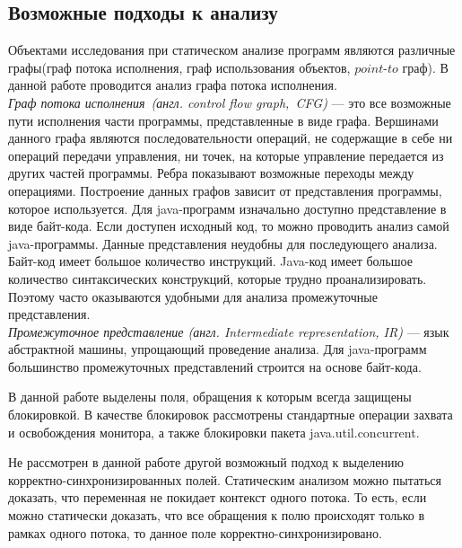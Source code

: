 \subsection{Возможные подходы к анализу}
Объектами исследования при статическом анализе программ являются различные графы(граф потока исполнения, граф использования объектов, $point$-$to$ граф\cite{Whaley:1999:CPE:320385.320400}). 
В данной работе проводится анализ графа потока исполнения. 
\\\emph{Граф потока исполнения\ (англ. control flow graph,\ CFG)} --- это все возможные пути исполнения части программы, представленные в виде графа. Вершинами данного графа являются последовательности операций, не содержащие в себе ни операций передачи управления, ни точек, на которые управление передается из других частей программы. Ребра показывают возможные переходы между операциями.
Построение данных графов зависит от представления программы, которое используется. Для java-программ изначально 
доступно представление в виде байт-кода. Если доступен исходный код, то можно проводить анализ самой java-программы.
Данные представления неудобны для последующего анализа. Байт-код имеет большое количество инструкций. Java-код имеет большое количество синтаксических конструкций, которые трудно проанализировать. Поэтому часто оказываются удобными для анализа промежуточные представления.
\\\emph{Промежуточное представление (англ. Intermediate representation, IR)} --- язык абстрактной машины, упрощающий проведение анализа. Для java-программ большинство промежуточных представлений строится на основе байт-кода.

В данной работе выделены поля, обращения к которым всегда защищены блокировкой. В качестве блокировок рассмотрены стандартные операции захвата и освобождения монитора, а также блокировки пакета java.util.concurrent.


Не рассмотрен в данной работе другой возможный подход к выделению корректно-синхронизированных полей.
Статическим анализом можно пытаться доказать, что переменная не покидает контекст одного потока. То есть, если можно статически доказать, что все обращения к полю происходят только в рамках одного потока, то данное поле корректно-синхронизировано\cite{Whaley:1999:CPE:320385.320400}.
\FloatBarrier
